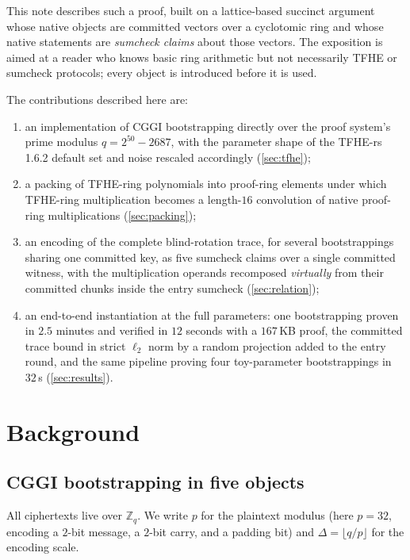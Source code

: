 \documentclass[11pt]{article}
\newcommand{\ZZ}{\mathbb{Z}}
\begin{document}
This note describes such a proof, built on a lattice-based succinct argument \cite{rokoko} whose native objects are committed vectors over a cyclotomic ring and whose native statements are \emph{sumcheck claims} about those vectors. The exposition is aimed at a reader who knows basic ring arithmetic but not necessarily TFHE or sumcheck protocols; every object is introduced before it is used.

The contributions described here are:
\begin{enumerate}
  \item an implementation of CGGI bootstrapping directly over the proof system's prime modulus $q = 2^{50} - 2687$, with the parameter shape of the TFHE-rs 1.6.2 default set and noise rescaled accordingly (\cref{sec:tfhe});
  \item a packing of TFHE-ring polynomials into proof-ring elements under which TFHE-ring multiplication becomes a length-$16$ convolution of native proof-ring multiplications (\cref{sec:packing});
  \item an encoding of the complete blind-rotation trace, for several bootstrappings sharing one committed key, as five sumcheck claims over a single committed witness, with the multiplication operands recomposed \emph{virtually} from their committed chunks inside the entry sumcheck (\cref{sec:relation});
  \item an end-to-end instantiation at the full parameters: one bootstrapping proven in $2.5$ minutes and verified in $12$ seconds with a $167$\,KB proof, the committed trace bound in strict $\ell_2$ norm by a random projection added to the entry round, and the same pipeline proving four toy-parameter bootstrappings in $32$\,s (\cref{sec:results}).
\end{enumerate}

\section{Background}

\subsection{CGGI bootstrapping in five objects}\label{sec:cggi}

All ciphertexts live over $\ZZ_q$. We write $p$ for the plaintext modulus (here $p = 32$, encoding a $2$-bit message, a $2$-bit carry, and a padding bit) and $\Delta = \lfloor q/p \rfloor$ for the encoding scale.
\end{document}
